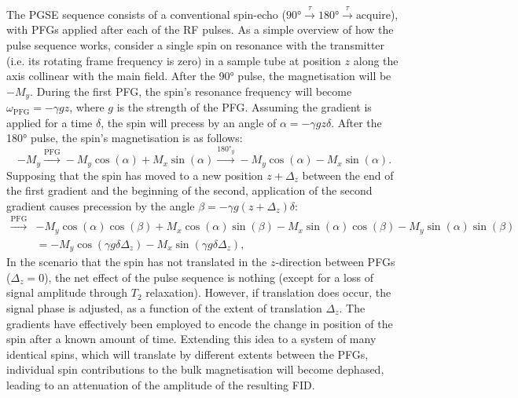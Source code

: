 The \ac{PGSE} sequence consists of a conventional spin-echo ($\ang{90}
\xrightarrow{\tau} \ang{180} \xrightarrow{\tau} \text{acquire}$), with
\acp{PFG} applied after each of the \ac{RF} pulses.
As a simple overview of how the pulse sequence works, consider a single spin on
resonance with the transmitter (i.e. its rotating frame frequency is zero) in a
sample tube at position $z$ along the axis collinear with the main field.
After the \ang{90} pulse, the magnetisation will be $-M_y$.
During the first \ac{PFG}, the spin's resonance frequency will become
$\omega_{\text{PFG}} = -\gamma g z$, where $g$ is the strength of the \ac{PFG}.
Assuming the gradient is applied for a time $\delta$, the spin will
precess by an angle of  $\alpha = -\gamma g z \delta$. After the \ang{180}
pulse, the spin's magnetisation is as follows:
\[
    -M_y
    \xrightarrow{\text{PFG}} -M_y \cos(\alpha) + M_x \sin(\alpha)
    \xrightarrow{\ang{180}_y} -M_y \cos(\alpha) - M_x \sin(\alpha).
\]
Supposing that the spin has moved to a new position $z + \Delta_z$
between the end of the first gradient and the beginning of the second,
application of the second gradient causes precession by the angle
$\beta = -\gamma g (z + \Delta_z) \delta$:
\begin{equation*}
   \begin{split}
        \xrightarrow{\text{PFG}}
            &-M_y \cos(\alpha)\cos(\beta) +
            M_x \cos(\alpha)\sin(\beta) -
            M_x \sin(\alpha)\cos(\beta) -
            M_y \sin(\alpha)\sin(\beta)\\
        &= -M_y \cos(\gamma g \delta \Delta_z) -
           M_x \sin(\gamma g \delta \Delta_z),
   \end{split}
\end{equation*}
In the scenario that the spin has not translated in the $z$-direction between
\acp{PFG} ($\Delta_z = 0$), the net effect of the pulse sequence is nothing
(except for a loss of signal amplitude through $T_2$ relaxation). However, if
translation does occur, the signal phase is adjusted, as a function of the
extent of translation $\Delta_z$. The gradients have effectively been employed
to encode the change in position of the spin after a known amount of time.
Extending this idea to a system of many identical spins, which will translate
by different extents between the \acp{PFG}, individual spin contributions to
the bulk magnetisation will become dephased, leading to an attenuation of the
amplitude of the resulting FID.

